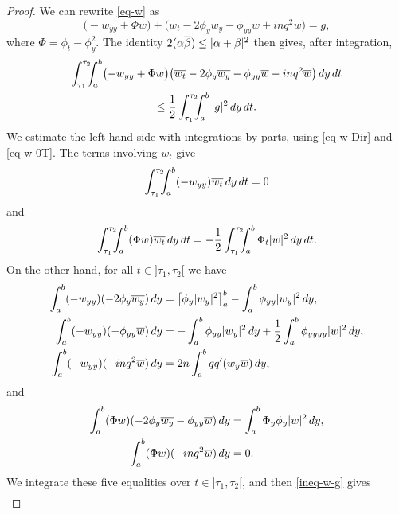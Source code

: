 \documentclass[JEP,XML,SOM,Unicode]{cedram}
\theoremstyle{plain}
\theoremstyle{definition}
\newcommand{\abs}[1]{\vert #1\vert}
\newcommand{\1}{\mathds 1}
\let\Re\relax
\DeclareMathOperator{\Re}{\mathsf{Re}\mkern2mu}
\let\Im\relax
\DeclareMathOperator{\Im}{\mathsf{Im}\mkern2mu}
\let\a\alpha
\let\b\beta
\begin{document}
\begin{proof}
We can rewrite \eqref{eq-w} as
\begin{equation*} \label{eq-g}
\bigl(- w_{yy} + \Phi w \bigr) + \bigl(w_t - 2 \phi_y w_y - \phi_{yy} w + i n q^2 w \bigr) = g,
\end{equation*}
where $\Phi = \phi_t - \phi_y^2$.
The identity $2\Re(\a\overline\b)\leq \abs{\a+\b}^2$ then gives, after integration,
\begin{multline} \label{ineq-w-g}
\Re \int_{\tau_1}^{\tau_2}\hspace*{-2mm} \int_a^b \bigl(- w_{yy} + \Phi w \bigr) \bigl(\overline{w_t} - 2 \phi_y \overline{w_y} - \phi_{yy} \overline{w} - i n q^2 \overline{w} \bigr) \, dy \, dt\\
\leq \frac 12 \int_{\tau_1}^{\tau_2}\hspace*{-2mm} \int_a^b |g|^2 \, dy \, dt.
\end{multline}
We estimate the left-hand side with integrations by parts, using \eqref{eq-w-Dir} and \eqref{eq-w-0T}. The terms involving $\overline{w_t}$ give
\[
\Re \int_{\tau_1}^{\tau_2}\hspace*{-2mm}\int_a^b (-w_{yy}) \overline{w_t} \, dy \, dt = 0
\]
and
\[
\Re \int_{\tau_1}^{\tau_2}\hspace*{-2mm} \int_a^b (\Phi w) \overline{w_t} \, dy \, dt = - \frac 1 2 \int_{\tau_1}^{\tau_2}\hspace*{-2mm} \int_a^b \Phi_t \abs{w}^2 \, dy \, dt.
\]
On the other hand, for all $t \in{}]\tau_1,\tau_2[$ we have
\begin{align*}
\Re \int_a^b (-w_{yy}) (-2 \phi_y \overline{w_{y}}) \, dy &= \big[ \phi_y \abs{w_y}^2 \big]_a^b - \int_a^b \phi_{yy} \abs{w_{y}}^2 \, dy,\\
\Re \int_a^b (-w_{yy}) (- \phi_{yy} \overline{w}) \, dy &= - \int_a^b \phi_{yy} \abs{w_{y}}^2 \, dy + \frac {1} 2 \int_a^b \phi_{yyyy} \abs{w}^2 \, dy,\\
\Re \int_a^b (-w_{yy}) (-inq^2 \overline{w}) \, dy &= 2n \int_a^b qq' \Im(w_y \overline w) \, dy,
\end{align*}
and
\begin{align*}
\Re \int_a^b (\Phi w) (-2 \phi_y \overline{w_{y}}- \phi_{yy} \overline{w}) \, dy &= \int_a^b \Phi_y \phi_y \abs w^2 \, dy,\\
\Re \int_a^b (\Phi w) (-inq^2 \overline{w}) \, dy &= 0.
\end{align*}
We integrate these five equalities over $t \in{}]\tau_1,\tau_2[$, and then \eqref{ineq-w-g} gives
\begin{multline*}

\end{multline*}
\end{proof}
\end{document}
